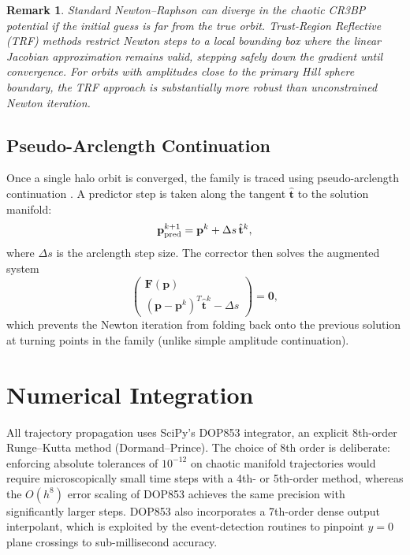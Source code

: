 \documentclass[12pt, a4paper]{article}
\newtheorem{remark}{Remark}
\begin{document}
\begin{remark}
Standard Newton--Raphson can diverge in the chaotic CR3BP potential if the
initial guess is far from the true orbit.
Trust-Region Reflective (TRF) methods \citep{More1978} restrict Newton
steps to a local bounding box where the linear Jacobian approximation
remains valid, stepping safely down the gradient until convergence.
For orbits with amplitudes close to the primary Hill sphere boundary, the
TRF approach is substantially more robust than unconstrained Newton
iteration.
\end{remark}

\subsection{Pseudo-Arclength Continuation}
\label{ssec:continuation}

Once a single halo orbit is converged, the family is traced using
pseudo-arclength continuation \citep{Keller1977}.
A predictor step is taken along the tangent $\hat{\mathbf{t}}$ to the
solution manifold:
\begin{equation}
  \mathbf{p}^{k+1}_{\rm pred} = \mathbf{p}^k + \Delta s\,\hat{\mathbf{t}}^k,
\end{equation}
where $\Delta s$ is the arclength step size.
The corrector then solves the augmented system
\begin{equation}
  \begin{pmatrix}
    \bm{F}(\mathbf{p}) \\
    (\mathbf{p}-\mathbf{p}^k)^T\hat{\mathbf{t}}^k - \Delta s
  \end{pmatrix}
  = \bm{0},
\end{equation}
which prevents the Newton iteration from folding back onto the previous
solution at turning points in the family (unlike simple amplitude
continuation).

\section{Numerical Integration}
\label{sec:numerics}

All trajectory propagation uses SciPy's DOP853 integrator, an explicit
8th-order Runge--Kutta method (Dormand--Prince).
The choice of 8th order is deliberate: enforcing absolute tolerances of
$10^{-12}$ on chaotic manifold trajectories would require microscopically
small time steps with a 4th- or 5th-order method, whereas the $O(h^8)$
error scaling of DOP853 achieves the same precision with significantly
larger steps.
DOP853 also incorporates a 7th-order dense output interpolant, which is
exploited by the event-detection routines to pinpoint $y=0$ plane crossings
to sub-millisecond accuracy.
\end{document}
